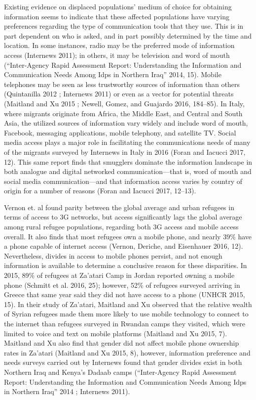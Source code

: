 \documentclass[
]{article}
\begin{document}
Existing evidence on displaced populations' medium of choice for
obtaining information seems to indicate that these affected populations
have varying preferences regarding the type of communication tools that
they use. This is in part dependent on who is asked, and in part
possibly determined by the time and location. In some instances, radio
may be the preferred mode of information access (Internews 2011); in
others, it may be television and word of mouth (``Inter-Agency Rapid
Assessment Report: Understanding the Information and Communication Needs
Among Idps in Northern Iraq'' 2014, 15). Mobile telephones may be seen
as less trustworthy sources of information than others (Quintanilla 2012
; Internews 2011) or even as a vector for potential threats (Maitland
and Xu 2015 ; Newell, Gomez, and Guajardo 2016, 184--85). In Italy,
where migrants originate from Africa, the Middle East, and Central and
South Asia, the utilized sources of information vary widely and include
word of mouth, Facebook, messaging applications, mobile telephony, and
satellite TV. Social media access plays a major role in facilitating the
communications needs of many of the migrants surveyed by Internews in
Italy in 2016 (Foran and Iacucci 2017, 12). This same report finds that
smugglers dominate the information landscape in both analogue and
digital networked communication---that is, word of mouth and social
media communication---and that information access varies by country of
origin for a number of reasons (Foran and Iacucci 2017, 12--13).

Vernon et. al found parity between the global average and urban refugees
in terms of access to 3G networks, but access significantly lags the
global average among rural refugee populations, regarding both 3G access
and mobile access overall. It also finds that most refugees own a mobile
phone, and nearly 39\% have a phone capable of internet access (Vernon,
Deriche, and Eisenhauer 2016, 12). Nevertheless, divides in access to
mobile phones persist, and not enough information is available to
determine a conclusive reason for these disparities. In 2015, 89\% of
refugees at Za'atari Camp in Jordan reported owning a mobile phone
(Schmitt et al. 2016, 25); however, 52\% of refugees surveyed arriving
in Greece that same year said they did not have access to a phone (UNHCR
2015, 15). In their study of Za'atari, Maitland and Xu observed that the
relative wealth of Syrian refugees made them more likely to use mobile
technology to connect to the internet than refugees surveyed in Rwandan
camps they visited, which were limited to voice and text on mobile
platforms (Maitland and Xu 2015, 7). Maitland and Xu also find that
gender did not affect mobile phone ownership rates in Za'atari (Maitland
and Xu 2015, 8), however, information preference and needs surveys
carried out by Internews found that gender divides exist in both
Northern Iraq and Kenya's Dadaab camps (``Inter-Agency Rapid Assessment
Report: Understanding the Information and Communication Needs Among Idps
in Northern Iraq'' 2014 ; Internews 2011).
\end{document}
